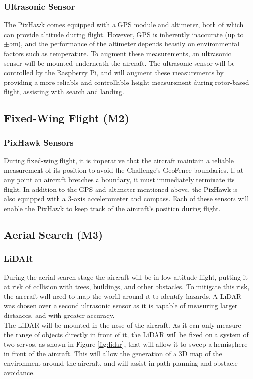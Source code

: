 \subsubsection*{Ultrasonic Sensor}
The PixHawk comes equipped with a GPS module and altimeter, both of which can provide altitude during flight. However, GPS is inherently inaccurate (up to $\pm$5m), and the performance of the altimeter depends heavily on environmental factors such as temperature. To augment these measurements, an ultrasonic sensor will be mounted underneath the aircraft. The ultrasonic sensor will be controlled by the Raspberry Pi, and will augment these measurements by providing a more reliable and controllable height measurement during rotor-based flight, assisting with search and landing.

\subsection{Fixed-Wing Flight (M2)}
\subsubsection*{PixHawk Sensors}
During fixed-wing flight, it is imperative that the aircraft maintain a reliable measurement of its position to avoid the Challenge's GeoFence boundaries. If at any point an aircraft breaches a boundary, it must immediately terminate its flight. In addition to the GPS and altimeter mentioned above, the PixHawk is also equipped with a 3-axis accelerometer and compass. Each of these sensors will enable the PixHawk to keep track of the aircraft's position during flight.

\subsection{Aerial Search (M3)}
\subsubsection*{LiDAR}
During the aerial search stage the aircraft will be in low-altitude flight, putting it at risk of collision with trees, buildings, and other obstacles. To mitigate this risk, the aircraft will need to map the world around it to identify hazards. A LiDAR was chosen over a second ultrasonic sensor as it is capable of measuring larger distances, and with greater accuracy.\\

The LiDAR will be mounted in the nose of the aircraft. As it can only measure the range of objects directly in front of it, the LiDAR will be fixed on a system of two servos, as shown in Figure \ref{fig:lidar}, that will allow it to sweep a hemisphere in front of the aircraft. This will allow the generation of a 3D map of the environment around the aircraft, and will assist in path planning and obstacle avoidance.

